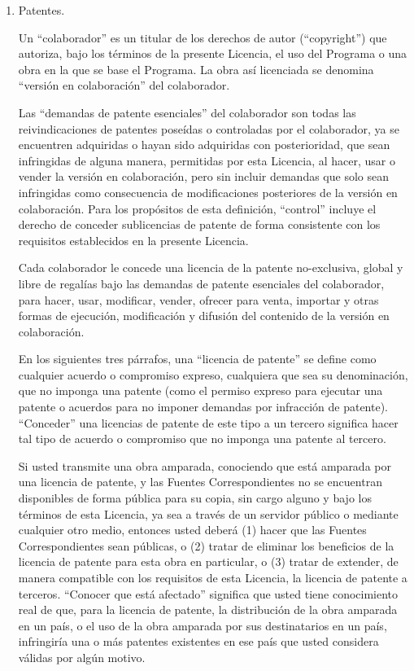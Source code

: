 {\begin{enumerate}
\item Patentes.

Un ``colaborador'' es un titular de los derechos de autor (``copyright'') que 
autoriza, bajo los t\'{e}rminos de la presente Licencia, el uso del Programa o 
una obra en la que se base el Programa. La obra as\'{i} licenciada se denomina 
``versi\'{o}n en colaboraci\'{o}n'' del colaborador.

Las ``demandas de patente esenciales'' del colaborador son todas las 
reivindicaciones de patentes pose\'{i}das o controladas por el colaborador, ya 
se encuentren adquiridas o hayan sido adquiridas con posterioridad, que sean 
infringidas de alguna manera, permitidas por esta Licencia, al hacer, usar 
o vender la versi\'{o}n en colaboraci\'{o}n, pero sin incluir demandas que solo sean 
infringidas como consecuencia de modificaciones posteriores de la versi\'{o}n 
en colaboraci\'{o}n. Para los prop\'{o}sitos de esta definici\'{o}n, ``control'' incluye 
el derecho de conceder sublicencias de patente de forma consistente con los 
requisitos establecidos en la presente Licencia.

Cada colaborador le concede una licencia de la patente no-exclusiva, 
global y libre de regal\'{i}as bajo las demandas de patente esenciales del 
colaborador, para hacer, usar, modificar, vender, ofrecer para venta, 
importar y otras formas de ejecuci\'{o}n, modificaci\'{o}n y difusi\'{o}n del 
contenido de la versi\'{o}n en colaboraci\'{o}n.

En los siguientes tres p\'{a}rrafos, una ``licencia de patente'' se define como 
cualquier acuerdo o compromiso expreso, cualquiera que sea su denominaci\'{o}n, 
que no imponga una patente (como el permiso expreso para ejecutar una 
patente o acuerdos para no imponer demandas por infracci\'{o}n de patente). 
``Conceder'' una licencias de patente de este tipo a un tercero significa 
hacer tal tipo de acuerdo o compromiso que no imponga una patente al tercero.

Si usted transmite una obra amparada, conociendo que est\'{a} amparada por 
una licencia de patente, y las Fuentes Correspondientes no se encuentran 
disponibles de forma p\'{u}blica para su copia, sin cargo alguno y bajo los 
t\'{e}rminos de esta Licencia, ya sea a trav\'{e}s de un servidor p\'{u}blico o mediante 
cualquier otro medio, entonces usted deber\'{a} (1) hacer que las Fuentes 
Correspondientes sean p\'{u}blicas, o (2) tratar de eliminar los beneficios de 
la licencia de patente para esta obra en particular, o (3) tratar de 
extender, de manera compatible con los requisitos de esta Licencia, la 
licencia de patente a terceros. ``Conocer que est\'{a} afectado'' significa que 
usted tiene conocimiento real de que, para la licencia de patente, la 
distribuci\'{o}n de la obra amparada en un pa\'{i}s, o el uso de la obra amparada 
por sus destinatarios en un pa\'{i}s, infringir\'{i}a una o m\'{a}s patentes existentes 
en ese pa\'{i}s que usted considera v\'{a}lidas por alg\'{u}n motivo.


\end{enumerate}}
